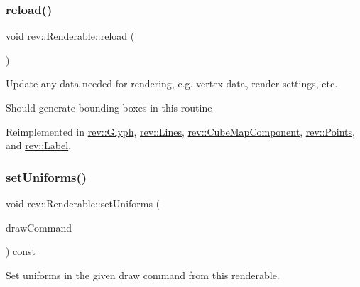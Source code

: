 \mbox{\label{classrev_1_1_renderable_a5acb035c13043156c23602406f1c8819}} 
\subsubsection{\texorpdfstring{reload()}{reload()}}
{\footnotesize\ttfamily void rev\+::\+Renderable\+::reload (\begin{DoxyParamCaption}{ }\end{DoxyParamCaption})\hspace{0.3cm}{\ttfamily [virtual]}}



Update any data needed for rendering, e.\+g. vertex data, render settings, etc. 

Should generate bounding boxes in this routine 

Reimplemented in \mbox{\hyperlink{classrev_1_1_glyph_a6742f5a33859665b06159a289a359fa4}{rev\+::\+Glyph}}, \mbox{\hyperlink{classrev_1_1_lines_a25311363c75d2acd0235e6786c076007}{rev\+::\+Lines}}, \mbox{\hyperlink{classrev_1_1_cube_map_component_ace8f36c985acb2621b2c11b8c05b514e}{rev\+::\+Cube\+Map\+Component}}, \mbox{\hyperlink{classrev_1_1_points_a9053da710d5444f2f8b467ffc1c4ecfd}{rev\+::\+Points}}, and \mbox{\hyperlink{classrev_1_1_label_ab32773f4ee881a3041bfbc0ba36137d7}{rev\+::\+Label}}.

\mbox{\label{classrev_1_1_renderable_a4418624ac4442899026f95c20e065467}} 
\subsubsection{\texorpdfstring{setUniforms()}{setUniforms()}}
{\footnotesize\ttfamily void rev\+::\+Renderable\+::set\+Uniforms (\begin{DoxyParamCaption}\item[{\mbox{\hyperlink{classrev_1_1_draw_command}{Draw\+Command}} \&}]{draw\+Command }\end{DoxyParamCaption}) const\hspace{0.3cm}{\ttfamily [virtual]}}



Set uniforms in the given draw command from this renderable. 

